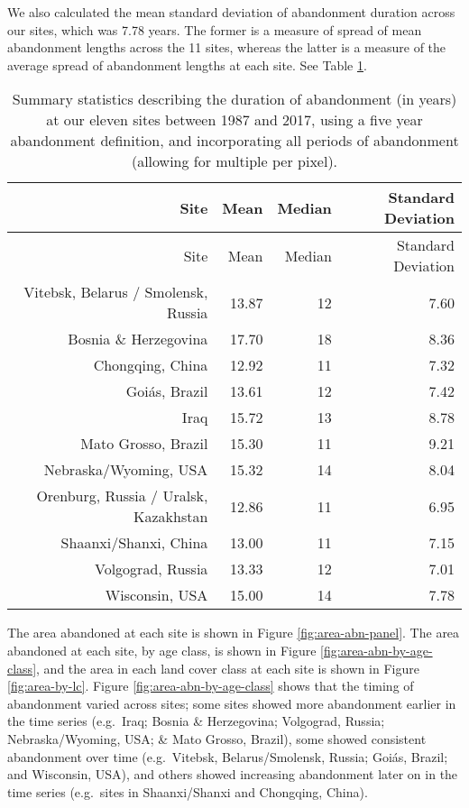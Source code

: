 \documentclass[9pt,twoside,lineno]{pnas-new}
\begin{document}
We also calculated the mean standard deviation of abandonment duration across our sites, which was 7.78 years.
The former is a measure of spread of mean abandonment lengths across the 11 sites, whereas the latter is a measure of the average spread of abandonment lengths at each site.
See Table \ref{tab:summary-stats-table}.

\begin{longtable}[]{@{}rrrr@{}}
\caption{\label{tab:summary-stats-table}Summary statistics describing the duration of abandonment (in years) at our eleven sites between 1987 and 2017, using a five year abandonment definition, and incorporating all periods of abandonment (allowing for multiple per pixel).}\tabularnewline
\toprule
Site & Mean & Median & Standard Deviation \\
\midrule
\endfirsthead
\toprule
Site & Mean & Median & Standard Deviation \\
\midrule
\endhead
Vitebsk, Belarus / Smolensk, Russia & 13.87 & 12 & 7.60 \\
Bosnia \& Herzegovina & 17.70 & 18 & 8.36 \\
Chongqing, China & 12.92 & 11 & 7.32 \\
Goiás, Brazil & 13.61 & 12 & 7.42 \\
Iraq & 15.72 & 13 & 8.78 \\
Mato Grosso, Brazil & 15.30 & 11 & 9.21 \\
Nebraska/Wyoming, USA & 15.32 & 14 & 8.04 \\
Orenburg, Russia / Uralsk, Kazakhstan & 12.86 & 11 & 6.95 \\
Shaanxi/Shanxi, China & 13.00 & 11 & 7.15 \\
Volgograd, Russia & 13.33 & 12 & 7.01 \\
Wisconsin, USA & 15.00 & 14 & 7.78 \\
\bottomrule
\end{longtable}

The area abandoned at each site is shown in Figure \ref{fig:area-abn-panel}.
The area abandoned at each site, by age class, is shown in Figure \ref{fig:area-abn-by-age-class}, and the area in each land cover class at each site is shown in Figure \ref{fig:area-by-lc}.
Figure \ref{fig:area-abn-by-age-class} shows that the timing of abandonment varied across sites; some sites showed more abandonment earlier in the time series (e.g.~Iraq; Bosnia \& Herzegovina; Volgograd, Russia; Nebraska/Wyoming, USA; \& Mato Grosso, Brazil), some showed consistent abandonment over time (e.g.~Vitebsk, Belarus/Smolensk, Russia; Goiás, Brazil; and Wisconsin, USA), and others showed increasing abandonment later on in the time series (e.g.~sites in Shaanxi/Shanxi and Chongqing, China).
\end{document}
